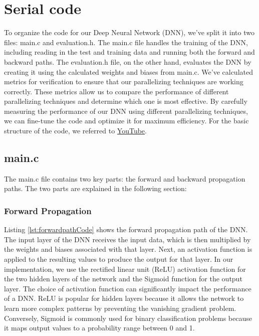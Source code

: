 \documentclass[11pt]{article}
\begin{document}
\section{Serial code}
To organize the code for our Deep Neural Network (DNN), we've split it into two files: main.c and evaluation.h. The main.c file handles the training of the DNN, including reading in the test and training data and running both the forward and backward paths. The evaluation.h file, on the other hand, evaluates the DNN by creating it using the calculated weights and biases from main.c. We've calculated metrics for verification to ensure that our parallelizing techniques are working correctly. These metrics allow us to compare the performance of different parallelizing techniques and determine which one is most effective. By carefully measuring the performance of our DNN using different parallelizing techniques, we can fine-tune the code and optimize it for maximum efficiency. For the basic structure of the code, we referred to \href{https://www.youtube.com/watch?v=LA4I3cWkp1E}{YouTube}.

\subsection{main.c}
The main.c file contains two key parts: the forward and backward propagation paths. The two parts are explained in the following section:

\subsubsection{Forward Propagation}
Listing \ref{lst:forwardpathCode} shows the forward propagation path of the DNN. The input layer of the DNN receives the input data, which is then multiplied by the weights and biases associated with that layer. Next, an activation function is applied to the resulting values to produce the output for that layer. In our implementation, we use the rectified linear unit (ReLU) activation function for the two hidden layers of the network and the Sigmoid function for the output layer. The choice of activation function can significantly impact the performance of a DNN. ReLU is popular for hidden layers because it allows the network to learn more complex patterns by preventing the vanishing gradient problem. Conversely, Sigmoid is commonly used for binary classification problems because it maps output values to a probability range between 0 and 1.
\end{document}
